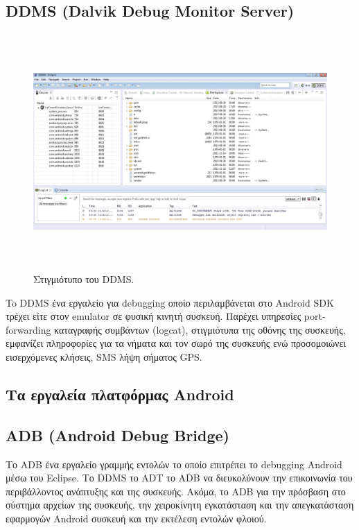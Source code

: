 \documentclass[12pt,twoside,openright]{report}
\begin{document}
\subsection{\lt DDMS (Dalvik Debug Monitor Server)\gt}
\begin{figure}[H]
\centering
\includegraphics[height=9cm]{images/ddms}
\caption{Στιγμιότυπο του \lt DDMS.\gt}
\label{fig:DDMS}
\end{figure}
To \lt DDMS  ένα εργαλείο για \lt debugging  οποίο περιλαμβάνεται στο \lt Android SDK  τρέχει είτε στον \lt emulator  σε φυσική κινητή συσκευή. Παρέχει υπηρεσίες \lt port-forwarding  καταγραφής συμβάντων \lt (logcat),  στιγμιότυπα της οθόνης της συσκευής, εμφανίζει πληροφορίες για τα νήματα και τον σωρό της συσκευής ενώ προσομοιώνει εισερχόμενες κλήσεις, \lt SMS  λήψη σήματος \lt GPS\gt.
\subsection*{Τα εργαλεία πλατφόρμας \lt Android\gt}
\subsection{\lt ADB (Android Debug Bridge)\gt}
Το \lt ADB  ένα εργαλείο γραμμής εντολών το οποίο επιτρέπει το \lt debugging  \lt Android  μέσω του \lt Eclipse\gt. Το \lt DDMS  το \lt ADT  το \lt ADB  να διευκολύνουν την επικοινωνία του περιβάλλοντος ανάπτυξης και της συσκευής. Ακόμα, το \lt ADB  για την πρόσβαση στο σύστημα αρχείων της συσκευής, την χειροκίνητη εγκατάσταση και την απεγκατάσταση εφαρμογών \lt Android  συσκευή και την εκτέλεση εντολών φλοιού.
\end{document}
